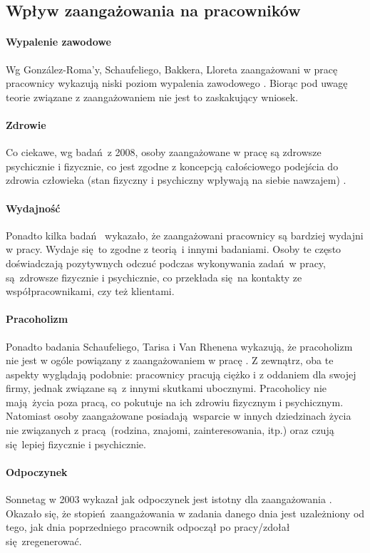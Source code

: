 \subsection{Wpływ zaangażowania na pracowników}
\label{sec:thoery-eng-infl2}
\paragraph{Wypalenie zawodowe}
Wg González-Roma'y, Schaufeliego, Bakkera, Lloreta zaangażowani w pracę pracownicy wykazują niski poziom wypalenia zawodowego \cite{gonzlez2006burnout}. Biorąc pod uwagę teorie związane z zaangażowaniem nie jest to zaskakujący wniosek.
\paragraph{Zdrowie}
Co ciekawe, wg badań z 2008, osoby zaangażowane w pracę są zdrowsze psychicznie i fizycznie, co jest zgodne z koncepcją całościowego podejścia do zdrowia człowieka (stan fizyczny i psychiczny wpływają na siebie nawzajem) \cite{schaufeli2008workaholism}.
\paragraph{Wydajność}
Ponadto kilka badań \cite{xanthopoulou2008working,xanthopoulou2009work} wykazało, że zaangażowani pracownicy są bardziej wydajni w pracy. Wydaje się to zgodne z teorią i innymi badaniami. Osoby te często doświadczają pozytywnych odczuć podczas wykonywania zadań w pracy, są zdrowsze fizycznie i psychicznie, co przekłada się na kontakty ze współpracownikami, czy też klientami.
\paragraph{Pracoholizm}
Ponadto badania Schaufeliego, Tarisa i Van Rhenena wykazują, że pracoholizm nie jest w ogóle powiązany z zaangażowaniem w pracę \cite{schaufeli2008workaholism}. Z zewnątrz, oba te aspekty wyglądają podobnie: pracownicy pracują ciężko i z oddaniem dla swojej firmy, jednak związane są z innymi skutkami ubocznymi. Pracoholicy nie mają życia poza pracą, co pokutuje na ich zdrowiu fizycznym i psychicznym. Natomiast osoby zaangażowane posiadają wsparcie w innych dziedzinach życia nie związanych z pracą (rodzina,
znajomi, zainteresowania, itp.) oraz czują się lepiej fizycznie i psychicznie.
\paragraph{Odpoczynek}
Sonnetag w 2003 wykazał jak odpoczynek jest istotny dla zaangażowania \cite{sonnentag2003recovery}. Okazało się, że stopień zaangażowania w zadania danego dnia jest uzależniony od tego, jak dnia poprzedniego pracownik odpoczął po pracy/zdołał się zregenerować.
